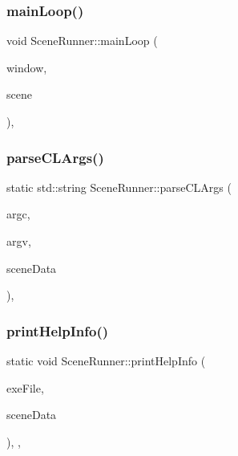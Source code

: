 \subsubsection{\texorpdfstring{mainLoop()}{mainLoop()}}
{\footnotesize\ttfamily void Scene\+Runner\+::main\+Loop (\begin{DoxyParamCaption}\item[{G\+L\+F\+Wwindow $\ast$}]{window,  }\item[{\mbox{\hyperlink{class_scene}{Scene}} \&}]{scene }\end{DoxyParamCaption})\hspace{0.3cm}{\ttfamily [inline]}, {\ttfamily [private]}}

\mbox{\label{class_scene_runner_a4ab05aea0a40be8973af80b1c100846c}} 
\subsubsection{\texorpdfstring{parseCLArgs()}{parseCLArgs()}}
{\footnotesize\ttfamily static std\+::string Scene\+Runner\+::parse\+C\+L\+Args (\begin{DoxyParamCaption}\item[{int}]{argc,  }\item[{char $\ast$$\ast$}]{argv,  }\item[{std\+::map$<$ std\+::string, std\+::string $>$ \&}]{scene\+Data }\end{DoxyParamCaption})\hspace{0.3cm}{\ttfamily [inline]}, {\ttfamily [static]}}

\mbox{\label{class_scene_runner_a6fa80fefb3e46bed4859000c1a730909}} 
\subsubsection{\texorpdfstring{printHelpInfo()}{printHelpInfo()}}
{\footnotesize\ttfamily static void Scene\+Runner\+::print\+Help\+Info (\begin{DoxyParamCaption}\item[{const char $\ast$}]{exe\+File,  }\item[{std\+::map$<$ std\+::string, std\+::string $>$ \&}]{scene\+Data }\end{DoxyParamCaption})\hspace{0.3cm}{\ttfamily [inline]}, {\ttfamily [static]}, {\ttfamily [private]}}

